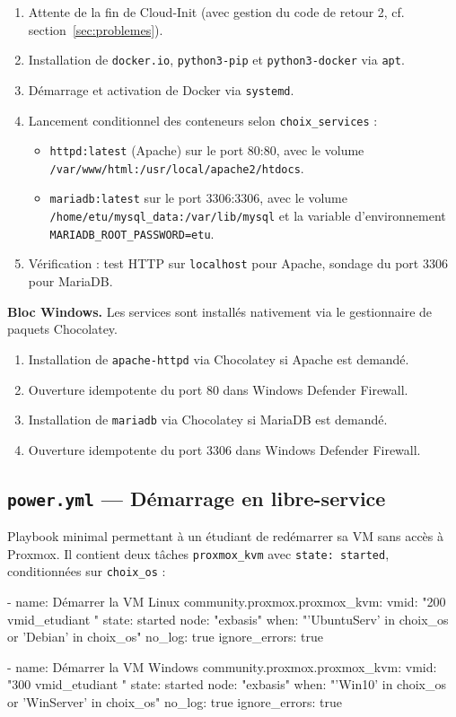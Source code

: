 \documentclass[a4paper]{article}
\newcommand{\cmd}[1]{\texttt{#1}}
\begin{document}
\begin{enumerate}
  \item Attente de la fin de Cloud-Init (avec gestion du code de retour 2, cf. section~\ref{sec:problemes}).
  \item Installation de \cmd{docker.io}, \cmd{python3-pip} et \cmd{python3-docker} via \cmd{apt}.
  \item Démarrage et activation de Docker via \cmd{systemd}.
  \item Lancement conditionnel des conteneurs selon \cmd{choix\_services} :
  \begin{itemize}
    \item \cmd{httpd:latest} (Apache) sur le port 80:80, avec le volume \cmd{/var/www/html:/usr/local/apache2/htdocs}.
    \item \cmd{mariadb:latest} sur le port 3306:3306, avec le volume \cmd{/home/etu/mysql\_data:/var/lib/mysql} et la variable d'environnement \cmd{MARIADB\_ROOT\_PASSWORD=etu}.
  \end{itemize}
  \item Vérification : test HTTP sur \cmd{localhost} pour Apache, sondage du port 3306 pour MariaDB.
\end{enumerate}

\textbf{Bloc Windows.} Les services sont installés nativement via le gestionnaire de paquets Chocolatey.

\begin{enumerate}
  \item Installation de \cmd{apache-httpd} via Chocolatey si Apache est demandé.
  \item Ouverture idempotente du port 80 dans Windows Defender Firewall.
  \item Installation de \cmd{mariadb} via Chocolatey si MariaDB est demandé.
  \item Ouverture idempotente du port 3306 dans Windows Defender Firewall.
\end{enumerate}

\subsection{\texttt{power.yml} --- Démarrage en libre-service}

Playbook minimal permettant à un étudiant de redémarrer sa VM sans accès à Proxmox. Il contient deux tâches \cmd{proxmox\_kvm} avec \cmd{state: started}, conditionnées sur \cmd{choix\_os} :

\begin{yamlcode}
- name: Démarrer la VM Linux
  community.proxmox.proxmox_kvm:
    vmid:  "200{{ vmid_etudiant }}"
    state: started
    node:  "exbasis"
  when:          "'UbuntuServ' in choix_os or 'Debian' in choix_os"
  no_log:        true
  ignore_errors: true

- name: Démarrer la VM Windows
  community.proxmox.proxmox_kvm:
    vmid:  "300{{ vmid_etudiant }}"
    state: started
    node:  "exbasis"
  when:          "'Win10' in choix_os or 'WinServer' in choix_os"
  no_log:        true
  ignore_errors: true
\end{yamlcode}
\end{document}
